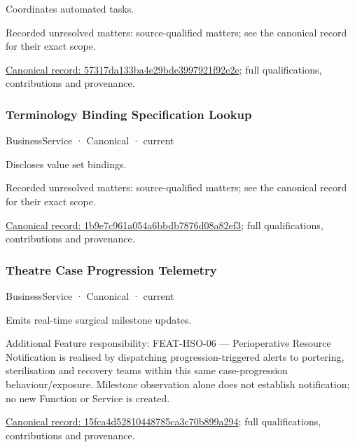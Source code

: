 Coordinates automated tasks.


{\small Recorded unresolved matters: source-qualified matters; see the canonical record for their exact scope.}\par
{\footnotesize \href{../../../../continuum/business/business-service/57317da133ba4e29bde3997921f92e2e.md}{Canonical record: 57317da133ba4e29bde3997921f92e2e}; full qualifications, contributions and provenance.}\par
\subsubsection{Terminology Binding Specification Lookup}

\label{element:1b9e7c961a054a6bbdb7876d08a82ef3}
{\small BusinessService · Canonical · current}\par

Discloses value set bindings.


{\small Recorded unresolved matters: source-qualified matters; see the canonical record for their exact scope.}\par
{\footnotesize \href{../../../../continuum/business/business-service/1b9e7c961a054a6bbdb7876d08a82ef3.md}{Canonical record: 1b9e7c961a054a6bbdb7876d08a82ef3}; full qualifications, contributions and provenance.}\par
\subsubsection{Theatre Case Progression Telemetry}

\label{element:15fca4d52810448785ca3c70b899a294}
{\small BusinessService · Canonical · current}\par

Emits real-time surgical milestone updates.



Additional Feature responsibility: FEAT-HSO-06 — Perioperative Resource Notification is realised by dispatching progression-triggered alerts to portering, sterilisation and recovery teams within this same case-progression behaviour/exposure. Milestone observation alone does not establish notification; no new Function or Service is created.


{\footnotesize \href{../../../../continuum/business/business-service/15fca4d52810448785ca3c70b899a294.md}{Canonical record: 15fca4d52810448785ca3c70b899a294}; full qualifications, contributions and provenance.}\par
